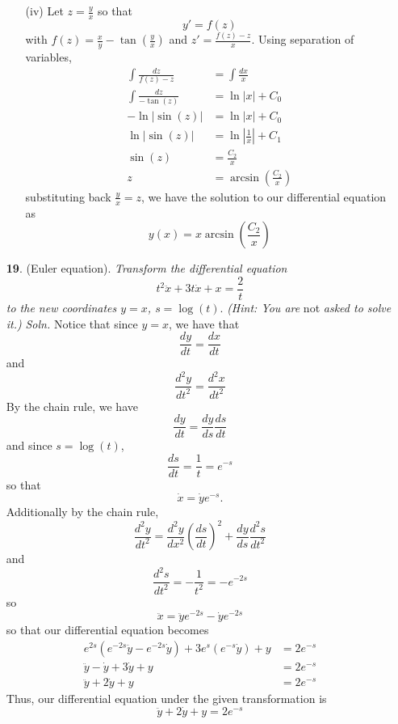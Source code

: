 \documentclass{article}
\begin{document}
\begin{itemize}
\begin{itemize}
        \item[(iv)] Let $z = \frac{y}{x}$ so that 
        \[y' = f(z)\]
        with $f(z) = \frac{x}{y} - \tan\left(\frac{y}{x}\right)$ and $z' = \frac{f(z) - z}{x}$. Using separation of variables,
        \begin{align*}
            \int\frac{dz}{f(z) - z} &= \int\frac{dx}{x}\\
            \int\frac{dz}{-\tan(z)} &= \ln|x| + C_0\\
            -\ln|\sin(z)| &= \ln|x| + C_0\\
            \ln|\sin(z)| &= \ln\left|\frac{1}{x}\right| + C_1\\
            \sin(z) &= \frac{C_2}{x}\\
            z &= \arcsin\left(\frac{C_2}{x}\right)
        \end{align*}
        substituting back $\frac{y}{x} = z$, we have the solution to our differential equation as
        \[y(x) = x\arcsin\left(\frac{C_2}{x}\right)\]

        
    \end{itemize}
    
    \item[\textbf{19}.] (Euler equation). \textit{Transform the differential equation}
    \[t^2\ddot{x} + 3t\dot{x} + x = \frac{2}{t}\]
    \textit{to the new coordinates $y = x$, $s = \log(t)$}. \textit{(Hint: You are} not \textit{asked to solve it.)}
    \newline\newline
    \textit{Soln.} Notice that since $y = x$, we have that 
    \[\frac{dy}{dt} = \frac{dx}{dt}\]
    and
    \[\frac{d^2y}{dt^2} = \frac{d^2x}{dt^2}\]
    By the chain rule, we have
    \[\frac{dy}{dt} = \frac{dy}{ds}\frac{ds}{dt}\]
    and since $s = \log(t)$, 
    \[\frac{ds}{dt} = \frac{1}{t} = e^{-s}\]
    so that 
    \[\dot{x} = \dot{y}e^{-s}.\]
    Additionally by the chain rule,
    \[\frac{d^2y}{dt^2} = \frac{d^2y}{dx^2}\left(\frac{ds}{dt}\right)^2 + \frac{dy}{ds}\frac{d^2s}{dt^2}\]
    and 
    \[\frac{d^2s}{dt^2} = -\frac{1}{t^2} = -e^{-2s}\]
    so
    \[\ddot{x} = \ddot{y}e^{-2s} - \dot{y}e^{-2s}\]
    so that our differential equation becomes
    \begin{align*}
        e^{2s}(e^{-2s}\ddot{y} - e^{-2s}\dot{y}) + 3e^s(e^{-s}\dot{y}) + y &= 2e^{-s}\\
        \ddot{y} - \dot{y} + 3\dot{y} + y &= 2e^{-s}\\
        \ddot{y} + 2\dot{y} + y &= 2e^{-s}
    \end{align*}
    Thus, our differential equation under the given transformation is
    \[\ddot{y} + 2\dot{y} + y = 2e^{-s}\]
    


\end{itemize}
\end{document}
